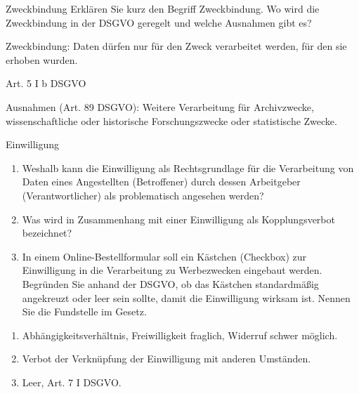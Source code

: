 \documentclass{article}
\begin{document}
\begin{exercise}{Zweckbindung}
  Erklären Sie kurz den Begriff Zweckbindung. Wo wird die Zweckbindung in der DSGVO geregelt und welche Ausnahmen gibt es?

  \begin{solution}
    Zweckbindung: Daten dürfen nur für den Zweck verarbeitet werden, für den sie erhoben wurden.\par
    Art. 5 I b DSGVO\par
    Ausnahmen (Art. 89 DSGVO): Weitere Verarbeitung für Archivzwecke, wissenschaftliche oder historische Forschungszwecke oder statistische Zwecke.
  \end{solution}
\end{exercise}

\begin{exercise}{Einwilligung}
  \begin{enumerate}
    \item Weshalb kann die Einwilligung als Rechtsgrundlage für die Verarbeitung von Daten eines Angestellten (Betroffener) durch dessen Arbeitgeber (Verantwortlicher) als problematisch angesehen werden?
    \item Was wird in Zusammenhang mit einer Einwilligung als Kopplungsverbot bezeichnet?
    \item In einem Online-Bestellformular soll ein Kästchen (Checkbox) zur Einwilligung in die Verarbeitung zu Werbezwecken eingebaut werden. Begründen Sie anhand der DSGVO, ob das Kästchen standardmäßig angekreuzt oder leer sein sollte, damit die Einwilligung wirksam ist. Nennen Sie die Fundstelle im Gesetz.
  \end{enumerate}

  \begin{solution}
    \begin{enumerate}
      \item Abhängigkeitsverhältnis, Freiwilligkeit fraglich, Widerruf schwer möglich.
      \item Verbot der Verknüpfung der Einwilligung mit anderen Umständen.
      \item Leer, Art. 7 I DSGVO.
    \end{enumerate}
  \end{solution}
\end{exercise}
\end{document}

